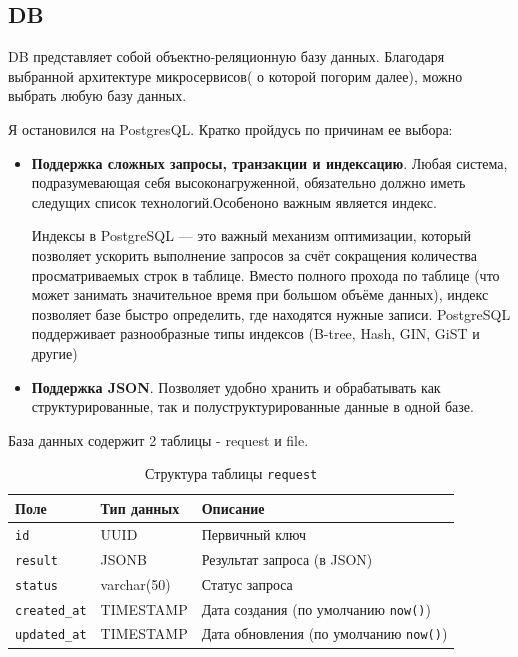 \subsection{DB}

DB представляет собой объектно-реляционную базу данных. Благодаря выбранной архитектуре   микросервисов( о которой погорим далее), можно выбрать любую базу данных.

Я остановился на PostgresQL. Кратко пройдусь по причинам ее выбора:
\begin{itemize}
\item  \textbf{Поддержка сложных запросы, транзакции и индексацию}. Любая система, подразумевающая себя высоконагруженной, обязательно должно иметь следущих список технологий.Особеноно важным является индекс.

Индексы в PostgreSQL — это важный механизм оптимизации, который позволяет ускорить выполнение запросов за счёт сокращения количества просматриваемых строк в таблице. Вместо полного прохода по таблице (что может занимать значительное время при большом объёме данных), индекс позволяет базе быстро определить, где находятся нужные записи. PostgreSQL поддерживает разнообразные типы индексов (B-tree, Hash, GIN, GiST и другие)
\item \textbf{Поддержка JSON}. Позволяет удобно хранить и обрабатывать как структурированные, так и полуструктурированные данные в одной базе. 
\end{itemize}

База данных содержит 2 таблицы  - request и file.
\begin{table}[H]
\centering
\caption{Структура таблицы \texttt{request}}
\begin{tabular}{|l|l|l|}
\hline
\textbf{Поле} & \textbf{Тип данных} & \textbf{Описание} \\
\hline
\texttt{id}          & UUID            & Первичный ключ \\
\texttt{result}      & JSONB           & Результат запроса (в JSON) \\
\texttt{status}      & varchar(50)     & Статус запроса \\
\texttt{created\_at} & TIMESTAMP       & Дата создания (по умолчанию \texttt{now()}) \\
\texttt{updated\_at} & TIMESTAMP       & Дата обновления (по умолчанию \texttt{now()}) \\
\hline
\end{tabular}
\end{table}

